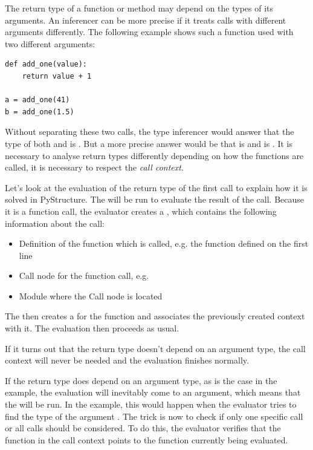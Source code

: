 \documentclass[12pt,halfparskip,DIV11,BCOR10mm]{scrreprt}
\begin{document}
The return type of a function or method may depend on the types of its arguments. An inferencer can be more precise if it treats calls with different arguments differently. The following example shows such a function used with two different arguments:

\begin{lstlisting}
def add_one(value):
    return value + 1

a = add_one(41)
b = add_one(1.5)
\end{lstlisting}


Without separating these two calls, the type inferencer would answer that the type of both  and  is . But a more precise answer would be that  is  and  is . It is necessary to analyse return types differently depending on how the functions are called, it is necessary to respect the \emph{call context}.

Let's look at the evaluation of the return type of the first  call to explain how it is solved in PyStructure. The  will be run to evaluate the result of the call. Because it is a function call, the evaluator creates a , which contains the following information about the call:

\begin{itemize}
	\item Definition of the function which is called, e.g. the  function defined on the first line
	\item Call node for the function call, e.g. 
	\item Module where the Call node is located
\end{itemize}

The  then creates a  for the  function and associates the previously created context with it. The evaluation then proceeds as usual.

If it turns out that the return type doesn't depend on an argument type, the call context will never be needed and the evaluation finishes normally.

If the return type does depend on an argument type, as is the case in the example, the evaluation will inevitably come to an argument, which means that the  will be run. In the example, this would happen when the evaluator tries to find the type of the argument . The trick is now to check if only one specific call or all calls should be considered. To do this, the evaluator verifies that the function in the call context points to the function currently being evaluated.
\end{document}
